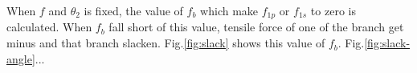 \documentclass{llncs}
\begin{document}


	When $f$ and $\theta_2$ is fixed, the value of $f_b$ which make $f_{1p}$ or $f_{1s}$ to zero is calculated.
	When $f_b$ fall short of this value, tensile force of one of the branch get minus and that branch slacken.
	Fig.\ref{fig:slack} shows this value of $f_b$.
	Fig.\ref{fig:slack-angle}...

\end{document}
